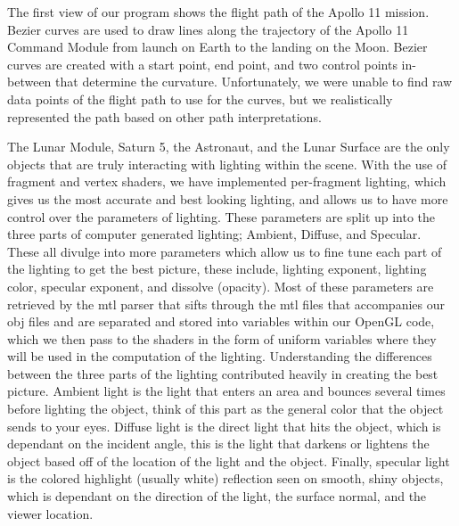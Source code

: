 \documentclass[onecolumn, draftclsnofoot,10pt, compsoc]{IEEEtran}
\begin{document}
The first view of our program shows the flight path of the Apollo 11 mission. Bezier curves are used to draw lines along the trajectory of the Apollo 11 Command Module from launch on Earth to the landing on the Moon. Bezier curves are created with a start point, end point, and two control points in-between that determine the curvature. Unfortunately, we were unable to find raw data points of the flight path to use for the curves, but we realistically represented the path based on other path interpretations. 


The Lunar Module, Saturn 5, the Astronaut, and the Lunar Surface are the only objects that are truly interacting with lighting within the scene. With the use of fragment and vertex shaders, we have implemented per-fragment lighting, which gives us the most accurate and best looking lighting, and allows us to have more control over the parameters of lighting. These parameters are split up into the three parts of computer generated lighting; Ambient, Diffuse, and Specular. These all divulge into more parameters which allow us to fine tune each part of the lighting to get the best picture, these include, lighting exponent, lighting color, specular exponent, and dissolve (opacity). Most of these parameters are retrieved by the mtl parser that sifts through the mtl files that accompanies our obj files and are separated and stored into variables within our OpenGL code, which we then pass to the shaders in the form of uniform variables where they will be used in the computation of the lighting. Understanding the differences between the three parts of the lighting contributed heavily in creating the best picture. Ambient light is the light that enters an area and bounces several times before lighting the object, think of this part as the general color that the object sends to your eyes. Diffuse light is the direct light that hits the object, which is dependant on the incident angle, this is the light that darkens or lightens the object based off of the location of the light and the object. Finally, specular light is the colored highlight (usually white) reflection seen on smooth, shiny objects, which is dependant on the direction of the light, the surface normal, and the viewer location. 
\end{document}

